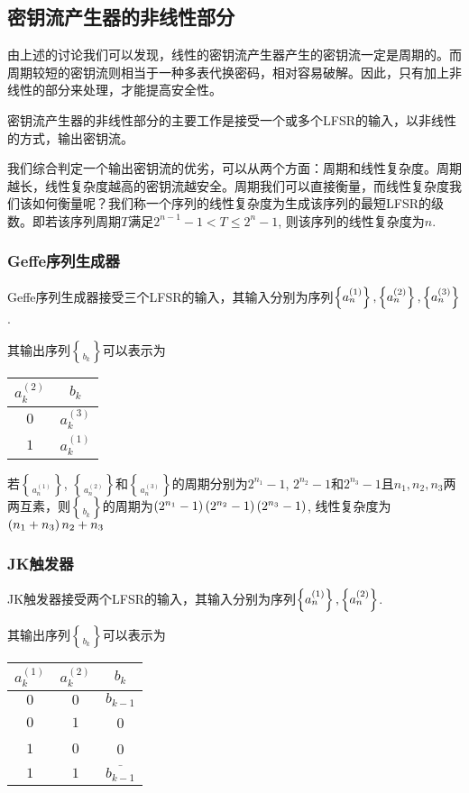 \subsection{密钥流产生器的非线性部分}
由上述的讨论我们可以发现，线性的密钥流产生器产生的密钥流一定是周期的。而周期较短的密钥流则相当于一种多表代换密码，相对容易破解。因此，只有加上非线性的部分来处理，才能提高安全性。\par
密钥流产生器的非线性部分的主要工作是接受一个或多个LFSR的输入，以非线性的方式，输出密钥流。\par
我们综合判定一个输出密钥流的优劣，可以从两个方面：周期和线性复杂度。周期越长，线性复杂度越高的密钥流越安全。周期我们可以直接衡量，而线性复杂度我们该如何衡量呢？我们称一个序列的线性复杂度为生成该序列的最短LFSR的级数。即若该序列周期$T$满足$2^{n-1}-1<T\leq 2^{n}-1$, 则该序列的线性复杂度为$n$.
\subsubsection{Geffe序列生成器}
Geffe序列生成器接受三个LFSR的输入，其输入分别为序列$\brace{a_n^{(1)}}, \brace{a_n^{(2)}}, \brace{a_n^{(3)}}$.\par
其输出序列$\brace{b_k}$可以表示为
\begin{table}[H]
    \centering
    \begin{tabular}{c|c}\hline
        $a_k^{(2)}$&$b_k$\\\hline
        $0$&$a_k^{(3)}$\\\hline
        $1$&$a_k^{(1)}$\\\hline
    \end{tabular}
\end{table}

若$\brace{a_n^{(1)}}$, $\brace{a_n^{(2)}}$和$\brace{a_n^{(3)}}$的周期分别为$2^{n_1}-1$, $2^{n_2}-1$和$2^{n_3}-1$且$n_1, n_2, n_3$两两互素，则$\brace{b_k}$的周期为$\pth{2^{n_1}-1}\pth{2^{n_2}-1}\pth{2^{n_3}-1}$, 线性复杂度为$\pth{n_1+n_3}n_2+n_3$
\subsubsection{JK触发器}
JK触发器接受两个LFSR的输入，其输入分别为序列$\brace{a_n^{(1)}}, \brace{a_n^{(2)}}$.\par
其输出序列$\brace{b_k}$可以表示为
\begin{table}[H]
    \centering
    \begin{tabular}{c|c|c}\hline
        $a_k^{(1)}$&$a_k^{(2)}$&$b_k$\\\hline
        $0$&$0$&$b_{k-1}$\\\hline
        $0$&$1$&0\\\hline
        $1$&$0$&0\\\hline
        $1$&$1$&$\overline{b_{k-1}}$\\\hline
    \end{tabular}
\end{table}

